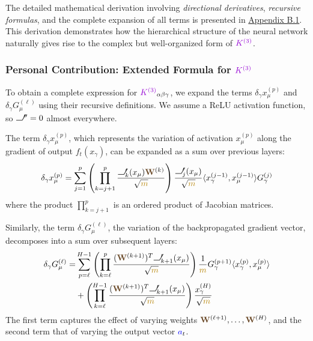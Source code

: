 \documentclass[a4paper]{article}
\DeclareRobustCommand{\ReLU}{\mathrel{\text{%
    \begin{tikzpicture}[baseline=(current bounding box.south)]
        \draw[thick] (0,0) -- (0.25,0) -- (0.4,0.25);
    \end{tikzpicture}}}\!\!}
\theoremstyle{plain}
\theoremstyle{definition}
\theoremstyle{remark}
\begin{document}
The detailed mathematical derivation involving \textit{directional derivatives}, \textit{recursive formulas}, and the complete expansion of all terms is presented in \hyperref[sec:appendix_k3_derivation]{Appendix B.1}. This derivation demonstrates how the hierarchical structure of the neural network naturally gives rise to the complex but well-organized form of $\textcolor{k3color}{K^{(3)}}$.







\subsubsection{Personal Contribution: Extended Formula for $\textcolor{k3color}{K^{(3)}}$}

To obtain a complete expression for $\textcolor{k3color}{K^{(3)}}_{\alpha\beta\gamma}$, we expand the terms $\delta_\gamma x^{(p)}_\mu$ and $\delta_\gamma G^{(\ell)}_\mu$ using their recursive definitions. 
We assume a ReLU activation function, so $\textcolor{relucolor}{\ReLU}''=0$ almost everywhere.


The term $\delta_\gamma x^{(p)}_\mu$, which represents the variation of activation $x^{(p)}_\mu$ along the gradient of output $f_t(x_\gamma)$, can be expanded as a sum over previous layers:
\begin{equation}
\delta_\gamma x^{(p)}_\mu = \sum_{j=1}^{p} \left( \prod_{k=j+1}^{p} \frac{\textcolor{relucolor}{\ReLU} '_{k}(x_\mu) \textcolor{weightcolor}{\mathbf{W}}^{(k)}}{\sqrt{\textcolor{darkyellow}{m}}} \right) \frac{\textcolor{relucolor}{\ReLU} '_{j}(x_\mu)}{\sqrt{\textcolor{darkyellow}{m}}} \langle x^{(j-1)}_\gamma, x^{(j-1)}_\mu \rangle G^{(j)}_\gamma
\end{equation}
where the product $\prod_{k=j+1}^{p}$ is an ordered product of Jacobian matrices.

Similarly, the term $\delta_\gamma G^{(\ell)}_\mu$, the variation of the backpropagated gradient vector, decomposes into a sum over subsequent layers:
\begin{align}
\delta_\gamma G^{(\ell)}_\mu = & \sum_{p=\ell}^{H-1} \left( \prod_{k=\ell}^{p} \frac{(\textcolor{weightcolor}{\mathbf{W}}^{(k+1)})^T \textcolor{relucolor}{\ReLU} '_{k+1}(x_\mu)}{\sqrt{\textcolor{darkyellow}{m}}} \right) \frac{1}{\textcolor{darkyellow}{m}} G^{(p+1)}_\gamma \langle x^{(p)}_\gamma, x^{(p)}_\mu \rangle \\
& + \left( \prod_{k=\ell}^{H-1} \frac{(\textcolor{weightcolor}{\mathbf{W}}^{(k+1)})^T \textcolor{relucolor}{\ReLU} '_{k+1}(x_\mu)}{\sqrt{\textcolor{darkyellow}{m}}} \right) \frac{x^{(H)}_\gamma}{\sqrt{\textcolor{darkyellow}{m}}}
\end{align}
The first term captures the effect of varying weights $\textcolor{weightcolor}{\mathbf{W}}^{(\ell+1)}, \dots, \textcolor{weightcolor}{\mathbf{W}}^{(H)}$, and the second term that of varying the output vector $\textcolor{blue}{a}_t$.
\end{document}
